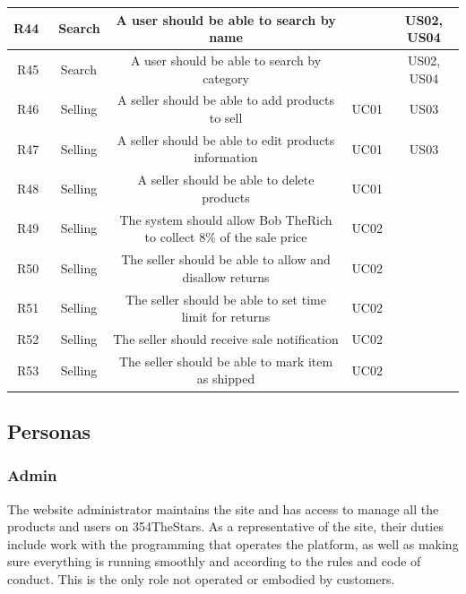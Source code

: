 \documentclass[11pt]{article}
\newcounter{use case ID}
\begin{document}
\begin{table}[H]
\begin{adjustbox}{width=\columnwidth,center}
\begin{tabular}{|r | c| c | c| c|}
                \hline
                R44 & \ Search & A user should be able to search by name & & US02, US04 \\ 
                \hline
                R45 & \ Search & A user should be able to search by category & & US02, US04 \\ 
                \hline
                R46 & \ Selling & A seller should be able to add products to sell & UC01 & US03 \\
                \hline
                R47 & \ Selling & A seller should be able to edit products information & UC01 & US03 \\ 
                \hline
                R48 & \ Selling & A seller should be able to delete products & UC01 &  \\ 
                \hline
                R49 & \ Selling & The system should allow Bob TheRich to collect 8\% of the sale price & UC02 &  \\
                \hline
                R50 & \ Selling & The seller should be able to allow and disallow returns & UC02 &  \\
                \hline
                R51 & \ Selling & The seller should be able to set time limit for returns & UC02 &  \\
                \hline
                R52 & \ Selling & The seller should receive sale notification & UC02 &  \\
                \hline
                R53 & \ Selling & The seller should be able to mark item as shipped & UC02 &  \\
                \hline
        \end{tabular}
    \end{adjustbox}
\end{table}
\clearpage


\subsection{Personas} \label{actors}
\subsubsection{Admin}
The website administrator maintains the site and has access to manage all the
products and users on 354TheStars. As a representative of the site, their duties include
work with the programming that operates the platform, as well as making sure
everything is running smoothly and according to the rules and code of conduct.
This is the only role not operated or embodied by customers.
\end{document}
